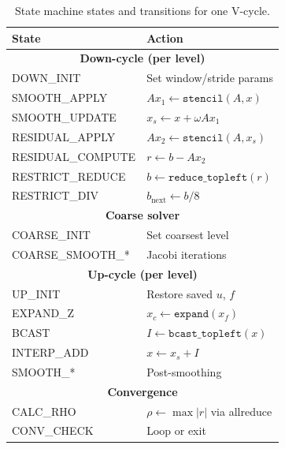 \documentclass[conference]{IEEEtran}
\begin{document}
            \begin{table}[t]
                \caption{State machine states and transitions for one V-cycle.}
                \label{tab:state_machine}
                \centering
                \footnotesize
                \setlength{\tabcolsep}{3pt}
                \begin{tabular}{|l||p{1.4in}|} \hline
                    \textbf{State} & \textbf{Action} \\ \hline \hline
                    \multicolumn{2}{|c|}{\textbf{Down-cycle (per level)}} \\ \hline \hline
                    \quad DOWN\_INIT                & Set window/stride params \\ \hline
                    \quad SMOOTH\_APPLY             & $Ax_1 \gets \texttt{stencil}(A, x)$ \\ \hline
                    \quad SMOOTH\_UPDATE            & $x_s \gets x + \omega Ax_1$ \\ \hline
                    \quad RESIDUAL\_APPLY           & $Ax_2 \gets \texttt{stencil}(A, x_s)$ \\ \hline
                    \quad RESIDUAL\_COMPUTE         & $r \gets b - Ax_2$ \\ \hline
                    \quad RESTRICT\_REDUCE          & $b \gets \texttt{reduce\_topleft}(r)$ \\ \hline
                    \quad RESTRICT\_DIV             & $b_{\mathrm{next}} \gets b/8$ \\ \hline \hline
                    \multicolumn{2}{|c|}{\textbf{Coarse solver}} \\ \hline \hline
                    \quad COARSE\_INIT              & Set coarsest level \\ \hline
                    \quad COARSE\_SMOOTH\_*         & Jacobi iterations \\ \hline \hline
                    \multicolumn{2}{|c|}{\textbf{Up-cycle (per level)}} \\ \hline \hline
                    \quad UP\_INIT                  & Restore saved $u$, $f$ \\ \hline
                    \quad EXPAND\_Z                 & $x_c \gets \texttt{expand}(x_f)$ \\ \hline
                    \quad BCAST                     & $I \gets \texttt{bcast\_topleft}(x)$ \\ \hline
                    \quad INTERP\_ADD               & $x \gets x_s + I$ \\ \hline
                    \quad SMOOTH\_*                 & Post-smoothing \\ \hline \hline
                    \multicolumn{2}{|c|}{\textbf{Convergence}} \\ \hline \hline
                    \quad CALC\_RHO                 & $\rho \gets \max|r|$ via allreduce \\ \hline
                    \quad CONV\_CHECK               & Loop or exit \\ \hline
                \end{tabular}
            \end{table}
\end{document}

